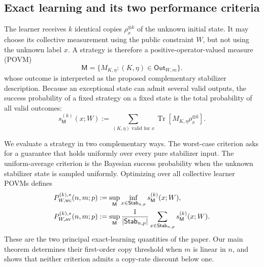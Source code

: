 \documentclass[11pt]{article}
\newcommand{\Tr}{\operatorname{Tr}}
\newcommand{\1}{\mathbf 1}
\theoremstyle{plain}
\theoremstyle{definition}
\theoremstyle{remark}
\begin{document}
\subsection{Exact learning and its two performance criteria}
\label{subsec:fixed-W-operational-criteria}

The learner receives $k$ identical copies $\rho_x^{\otimes k}$ of the unknown
initial state.  It may choose its collective measurement using the public
constraint $W$, but not using the unknown label $x$.  A strategy is therefore a positive-operator-valued measure (POVM)
\begin{equation}
 \mathsf M=\{M_{K,\eta}:(K,\eta)\in\mathsf{Out}_{W,m}\}.
 \label{eq:fixed-W-exact-learner-POVM}
\end{equation}
whose outcome is interpreted as the proposed complementary stabilizer
description.  Because an exceptional state can admit several valid outputs,
the success probability of a fixed strategy on a fixed state is the total
probability of all valid outcomes:
\begin{equation}
 s_{\mathsf M}^{(k)}(x;W)
 :=\sum_{(K,\eta)\text{ valid for }x}
 \Tr[M_{K,\eta}\rho_x^{\otimes k}].
 \label{eq:fixed-W-statewise-success}
\end{equation}

We evaluate a strategy in two complementary ways.  The worst-case criterion
asks for a guarantee that holds uniformly over every pure stabilizer input.
The uniform-average criterion is the Bayesian success probability when the
unknown stabilizer state is sampled uniformly.  Optimizing over all collective
learner POVMs defines
\begin{align}
 P_{W,\rm wc}^{(k),*}(n,m;p)
 &:=\sup_{\mathsf M}\inf_{x\in\mathsf{Stab}_{n,p}}
 s_{\mathsf M}^{(k)}(x;W),
 \label{eq:fixed-W-wc-success}\\
 P_{W,\rm av}^{(k),*}(n,m;p)
 &:=\sup_{\mathsf M}\frac1{|\mathsf{Stab}_{n,p}|}
 \sum_{x\in\mathsf{Stab}_{n,p}}s_{\mathsf M}^{(k)}(x;W).
 \label{eq:fixed-W-av-success}
\end{align}
These are the two principal exact-learning quantities of the paper.  Our main
theorem determines their first-order copy threshold when $m$ is linear in
$n$, and shows that neither criterion admits a copy-rate discount below one.
\end{document}
